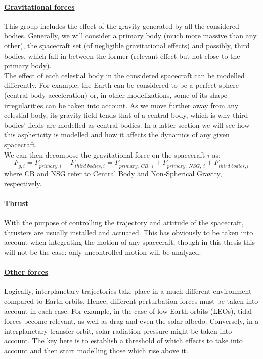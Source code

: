 			\paragraph{\underline{Gravitational forces}\\} 
			\indent This group includes the effect of the gravity generated by all the considered bodies. Generally, we will consider a primary body (much more massive than any other), the spacecraft set (of negligible gravitational effects) and possibly, third bodies, which fall in between the former (relevant effect but not close to the primary body). \\
			\indent The effect of each celestial body in the considered spacecraft can be modelled differently. For example, the Earth can be considered to be a perfect sphere (central body acceleration) or, in other modelizations, some of its shape irregularities can be taken into account. As we move further away from any celestial body, its gravity field tends that of a central body, which is why third bodies' fields are modelled as central bodies. In a latter section we will see how this asphericity is modelled and how it affects the dynamics of any given spacecraft. \\
			\indent We can then decompose the gravitational force on the spacecraft $i$ as:
			\[
			\underline{F}_{g, i} = \underline{F}_{primary, i} + \underline{F}_{third\; bodies, i} = \underline{F}_{primary, \;CB, \;i} + \underline{F}_{primary, \; NSG, \;i} + \underline{F}_{third\; bodies, i}
			\]
			\noindent where CB and NSG refer to Central Body and Non-Spherical Gravity, respectively.
			\paragraph{\underline{Thrust}\\} 
			\indent With the purpose of controlling the trajectory and attitude of the spacecraft, thrusters are usually installed and actuated. This has obviously to be taken into account when integrating the motion of any spacecraft, though in this thesis this will not be the case: only uncontrolled motion will be analyzed.\\
			\paragraph{\underline{Other forces}\\} 
			\indent Logically, interplanetary trajectories take place in a much different environment compared to Earth orbits. Hence, different perturbation forces must be taken into account in each case. For example, in the case of low Earth orbits (LEOs), tidal forces become relevant, as well as drag and even the solar albedo. Conversely, in a interplanetary transfer orbit, solar radiation pressure might be taken into account. The key here is to establish a threshold of which effects to take into account and then start modelling those which rise above it.\\
